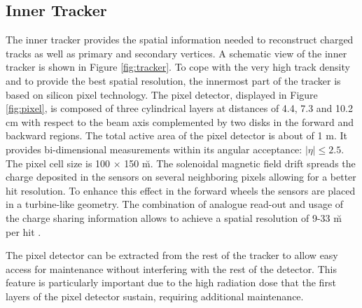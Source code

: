 \subsection{Inner Tracker}
\label{sec:inner_tracker}

The inner tracker provides the spatial information needed to reconstruct charged tracks as well as primary and secondary vertices. A schematic view of the inner tracker is shown in Figure \ref{fig:tracker}. To cope with the very high track density and to provide the best spatial resolution, the innermost part of the tracker is based on silicon pixel technology. The pixel detector, displayed in Figure \ref{fig:pixel}, is composed of three cylindrical layers at distances of 4.4, 7.3 and 10.2 cm with respect to the beam axis complemented by two disks  in the forward and backward regions. The total active area of the pixel detector is about of 1 m\sq.  It provides bi-dimensional measurements within its angular acceptance: $|\eta| \leq 2.5$. The pixel cell size is 100 $\times$ 150 \u m\sq. 
The solenoidal magnetic field drift spreads the charge deposited in the sensors on several neighboring pixels allowing for a better hit resolution.
To enhance this effect in the forward wheels the sensors are placed in a turbine-like geometry. The combination of analogue read-out and usage of the charge sharing information allows to achieve a spatial resolution of 9-33 \u m per hit \cite{trackingpaper}. 

The pixel detector can be extracted from the rest of the tracker to allow easy access for maintenance without interfering with the rest of the detector. This feature is particularly important due to the high radiation dose that the first layers of the pixel detector sustain, requiring additional maintenance.

